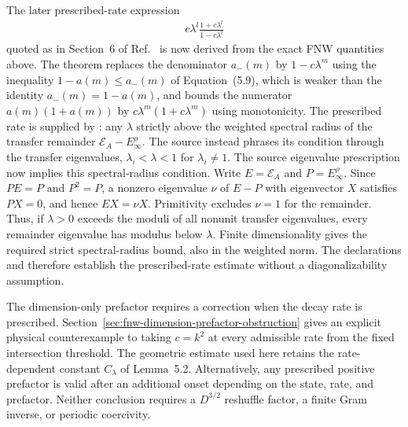 \documentclass{article}
\begin{document}
The later prescribed-rate expression
\begin{align}
    c\lambda^l\frac{1+c\lambda^l}{1-c\lambda^l}
    \label{eq:cpgsv21_martingale_overlap_optimized_fnw_expression}
\end{align}
quoted as  in Section~6 of
Ref.~\cite{Nachtergaele1996Spectral} is now derived from the exact FNW
quantities above. The theorem
replaces the denominator $a_-(m)$ by $1-c\lambda^m$ using the inequality
$1-a(m)\leq a_-(m)$ of Equation~(5.9), which is weaker than the identity
$a_-(m)=1-a(m)$, and bounds the numerator $a(m)(1+a(m))$ by
$c\lambda^m(1+c\lambda^m)$ using monotonicity. The prescribed rate is supplied
by
: any
$\lambda$ strictly above the weighted spectral radius of the transfer
remainder $\mathcal E_A-E_\infty^\rho$. The source instead phrases its
condition through the transfer eigenvalues, $\lambda_i<\lambda<1$ for
$\lambda_i\neq1$. The source eigenvalue prescription now implies this spectral-radius
condition. Write $E=\mathcal E_A$ and $P=E_\infty^\rho$. Since
$PE=P$ and $P^2=P$, a nonzero eigenvalue $\nu$ of $E-P$ with eigenvector
$X$ satisfies $PX=0$, and hence $EX=\nu X$. Primitivity excludes $\nu=1$
for the remainder. Thus, if $\lambda>0$ exceeds the moduli of all nonunit
transfer eigenvalues, every remainder eigenvalue has modulus below
$\lambda$. Finite dimensionality gives the required strict spectral-radius
bound, also in the weighted norm. The declarations
and
therefore establish the prescribed-rate estimate without a diagonalizability
assumption.

The dimension-only prefactor requires a correction when the decay rate is
prescribed. Section~\ref{sec:fnw-dimension-prefactor-obstruction} gives an
explicit physical counterexample to taking $c=k^2$ at every admissible rate
from the fixed intersection threshold. The geometric estimate used here
retains the rate-dependent constant $C_\lambda$ of Lemma~5.2. Alternatively,
any prescribed positive prefactor is valid after an additional onset depending
on the state, rate, and prefactor. Neither conclusion requires a
$D^{3/2}$ reshuffle factor, a finite Gram inverse, or periodic coercivity.
\end{document}
